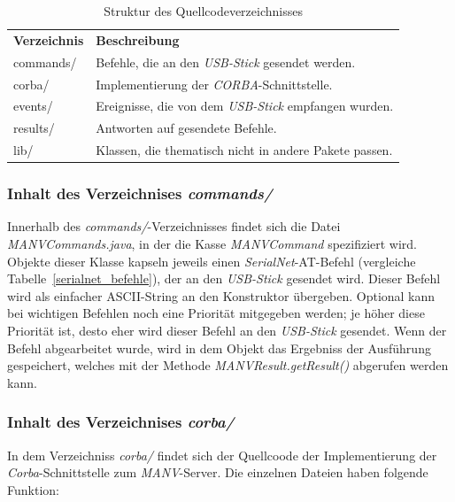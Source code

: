     \begin{table}
        \begin{tabular}{ll}
            \textbf{Verzeichnis} & \textbf{Beschreibung}\\

           commands/ & Befehle, die an den \emph{USB-Stick} gesendet werden.\\
           corba/    & Implementierung der \emph{CORBA}-Schnittstelle.\\
           events/   & Ereignisse, die von dem \emph{USB-Stick} empfangen wurden.\\
           results/  & Antworten auf gesendete Befehle.\\
           lib/      & Klassen, die thematisch nicht in andere Pakete passen.\\
        \end{tabular}
        \caption{Struktur des Quellcodeverzeichnisses}
    \end{table}

    \subsubsection{Inhalt des Verzeichnises \emph{commands/}}

    Innerhalb des \emph{commands/}-Verzeichnisses findet sich die Datei \emph{MANVCommands.java},
    in der die Kasse \emph{MANVCommand} spezifiziert wird. Objekte dieser Klasse kapseln jeweils
    einen \emph{SerialNet}-AT-Befehl (vergleiche Tabelle~\ref{serialnet_befehle}), der an den
    \emph{USB-Stick} gesendet wird. Dieser Befehl wird als einfacher ASCII-String an den Konstruktor
    übergeben. Optional kann bei wichtigen Befehlen noch eine Priorität mitgegeben werden;
    je höher diese Priorität ist, desto eher wird dieser Befehl an den \emph{USB-Stick}
    gesendet. Wenn der Befehl abgearbeitet wurde, wird in dem Objekt das Ergebniss
    der Ausführung gespeichert, welches mit der Methode \emph{MANVResult.getResult()}
    abgerufen werden kann.

    \subsubsection{Inhalt des Verzeichnises \emph{corba/}}

    In dem Verzeichniss \emph{corba/} findet sich der Quellcoode der Implementierung der \emph{Corba}-Schnittstelle
    zum \emph{MANV}-Server. Die einzelnen Dateien haben folgende Funktion:

